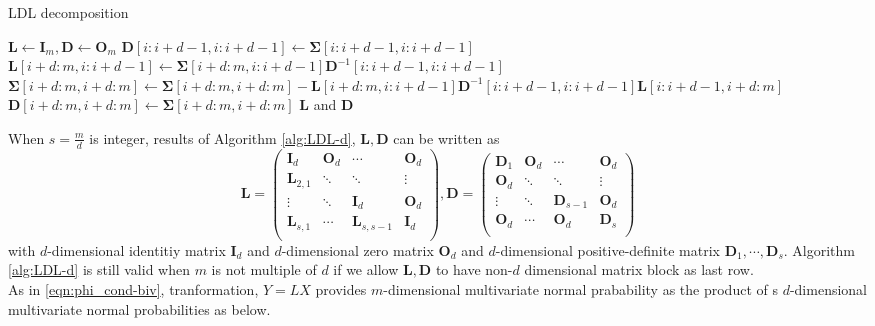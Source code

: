 \begin{algorithm}[ht]
	\caption{LDL decomposition}
	\begin{algorithmic}[1]
		\State $\mathbf{L} \leftarrow \mathbf{I}_m, \mathbf{D} \leftarrow \mathbf{O}_m$
		\State $\mathbf{D}[i:i+d-1,i:i+d-1] \leftarrow \boldsymbol{\Sigma}[i:i+d-1,i:i+d-1]$
		\State $\mathbf{L}[i+d:m,i:i+d-1] \leftarrow \boldsymbol{\Sigma}[i+d:m,i:i+d-1]\mathbf{D}^{-1}[i:i+d-1,i:i+d-1]$
		\State $\boldsymbol{\Sigma}[i+d:m,i+d:m]\leftarrow\boldsymbol{\Sigma}[i+d:m,i+d:m]-\mathbf{L}[i+d:m,i:i+d-1] \mathbf{D}^{-1}[i:i+d-1,i:i+d-1] \mathbf{L}[i:i+d-1,i+d:m]$
			\State $\mathbf{D}[i+d:m,i+d:m] \leftarrow \boldsymbol{\Sigma}[i+d:m,i+d:m]$
		\EndIf
		\EndFor
		\State\Return $\mathbf{L}$ and $\mathbf{D}$
		\EndProcedure
		
	\end{algorithmic}\label{alg:LDL-d}
\end{algorithm}
When $s=\frac{m}{d}$ is integer, results of Algorithm \ref{alg:LDL-d}, $\mathbf{L}, \mathbf{D}$ can be written as
$$
\mathbf{L} = \begin{pmatrix}
\mathbf{I}_d & \mathbf{O}_d & \cdots &\mathbf{O}_d\\
\mathbf{L}_{2,1} & \ddots & \ddots &\vdots\\
\vdots & \ddots & \mathbf{I}_d & \mathbf{O}_d\\
\mathbf{L}_{s,1} & \cdots & \mathbf{L}_{s,s-1} &\mathbf{I}_d\\
\end{pmatrix},
\mathbf{D} = \begin{pmatrix}
\mathbf{D}_1 & \mathbf{O}_d & \cdots &\mathbf{O}_d\\
\mathbf{O}_{d} & \ddots & \ddots &\vdots\\
\vdots & \ddots & \mathbf{D}_{s-1} & \mathbf{O}_d\\
\mathbf{O}_d & \cdots & \mathbf{O}_d &\mathbf{D}_s\\
\end{pmatrix}
$$
with $d$-dimensional identitiy matrix $\mathbf{I}_d$ and $d$-dimensional zero matrix $\mathbf{O}_d$ and $d$-dimensional positive-definite matrix $\mathbf{D}_1,\cdots,\mathbf{D}_s$. Algorithm \ref{alg:LDL-d} is still valid when $m$ is not multiple of $d$ if we allow $\mathbf{L},\mathbf{D}$ to have non-$d$ dimensional matrix block as last row.\\
As in \eqref{eqn:phi_cond-biv}, tranformation, $Y=LX$ provides $m$-dimensional multivariate normal prabability as the product of s $d$-dimensional multivariate normal probabilities as below.
